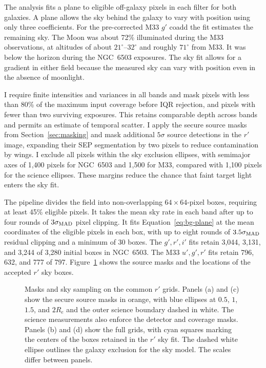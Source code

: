 The analysis fits a plane to eligible off-galaxy pixels in each filter for both galaxies. A plane allows the sky behind the galaxy to vary with position using only three coefficients. For the pre-corrected M33 $g'$ coadd the fit estimates the remaining sky. The Moon was about 72\% illuminated during the M33 observations, at altitudes of about $21^{\circ}$--$32^{\circ}$ and roughly $71^{\circ}$ from M33. It was below the horizon during the NGC~6503 exposures. The sky fit allows for a gradient in either field because the measured sky can vary with position even in the absence of moonlight.

I require finite intensities and variances in all bands and mask pixels with less than 80\% of the maximum input coverage before IQR rejection, and pixels with fewer than two surviving exposures. This retains comparable depth across bands and permits an estimate of temporal scatter. I apply the secure source masks from Section~\ref{sec:masking} and mask additional $5\sigma$ source detections in the $r'$ image, expanding their SEP segmentation by two pixels to reduce contamination by wings. I exclude all pixels within the sky exclusion ellipses, with semimajor axes of 1,400 pixels for NGC~6503 and 1,500 for M33, compared with 1,100 pixels for the science ellipses. These margins reduce the chance that faint target light enters the sky fit.

The pipeline divides the field into non-overlapping $64\times64$-pixel boxes, requiring at least 45\% eligible pixels. It takes the mean sky rate in each band after up to four rounds of $3\sigma_{\rm MAD}$ pixel clipping. It fits Equation~\ref{eq:bg-plane} at the mean coordinates of the eligible pixels in each box, with up to eight rounds of $3.5\sigma_{\rm MAD}$ residual clipping and a minimum of 30 boxes. The $g',r',i'$ fits retain 3,044, 3,131, and 3,244 of 3,280 initial boxes in NGC~6503. The M33 $u',g',r'$ fits retain 796, 632, and 777 of 797. Figure~\ref{fig:masks} shows the source masks and the locations of the accepted $r'$ sky boxes.

\begin{figure}[t]
    \caption{Masks and sky sampling on the common $r'$ grids. Panels (a) and (c) show the secure source masks in orange, with blue ellipses at $0.5$, $1$, $1.5$, and $2R_e$ and the outer science boundary dashed in white. The science measurements also enforce the detector and coverage masks. Panels (b) and (d) show the full grids, with cyan squares marking the centers of the boxes retained in the $r'$ sky fit. The dashed white ellipse outlines the galaxy exclusion for the sky model. The scales differ between panels.}
    \label{fig:masks}
\end{figure}

